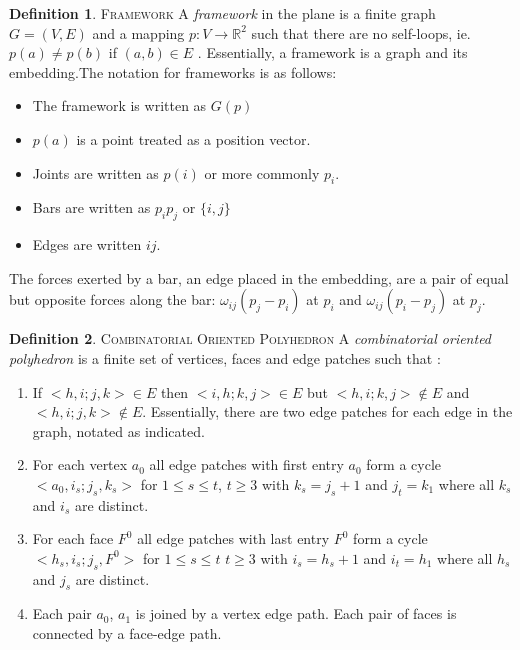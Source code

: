\documentclass[11pt]{article}
\newcommand{\R}{\mathbb{R}}
\theoremstyle{definition}
\newtheorem{definition}{Definition}[section]
\begin{document}
  	\theoremstyle{definition}
  	\begin{definition}{\textsc{Framework}}
		A \emph{framework} in the plane is a finite graph $G=(V,E)$ and a mapping $p: V \rightarrow \R^2$ such that there are no self-loops, ie. $p(a) \neq p(b)$ if $(a,b) \in E$ \cite{mccProof}. 
		Essentially, a framework is a graph and its embedding.The notation for frameworks is as follows: 
		\begin{itemize}
			\item The framework is written as $G(p)$
			\item $p(a)$ is a point treated as a position vector. 
			\item Joints are written as $p(i)$ or more commonly $p_i$.
			\item Bars are written as $p_ip_j$ or $\{i,j\}$
			\item Edges are written $ij$.
		\end{itemize}
	\end{definition}
	
	The forces exerted by a bar, an edge placed in the embedding, are a pair of equal but opposite forces along the bar: $\omega_{ij}(p_j - p_i)$ at $p_i$ and $\omega_{ij}(p_i - p_j)$ at $p_j$. 
	
	\theoremstyle{definition}
	\begin{definition}{\textsc{Combinatorial Oriented Polyhedron}}
		A \emph{combinatorial oriented polyhedron} is a finite set of vertices, faces and edge patches such that \cite{mccProof}:
		\begin{enumerate}
			\item If $<h,i;j,k> \in E$ then $<i,h;k,j> \in E$ but $<h,i;k,j> \not\in E$ and $<h,i;j,k> \not\in E$. Essentially, there are two edge patches for each edge in the graph, notated as indicated.
			\item For each vertex $a_0$ all edge patches with first entry $a_0$ form a cycle $<a_0,i_s;j_s,k_s>$ for $1\leq s \leq t$, $t\geq3$ with $k_s = j_s + 1$ and $j_t = k_1$ where all $k_s$ and $i_s$ are distinct. 
			\item For each face $F^0$ all edge patches with last entry $F^0$ form a cycle $<h_s, i_s;j_s,F^0>$ for $1\leq s \leq t$ $t\geq3$ with $i_s = h_s + 1$ and $i_t = h_1$ where all $h_s$ and $j_s$ are distinct.
			\item Each pair $a_0$, $a_1$ is joined by a vertex edge path. Each pair of faces is connected by a face-edge path. 
		\end{enumerate}
	\end{definition}
	
\end{document}
